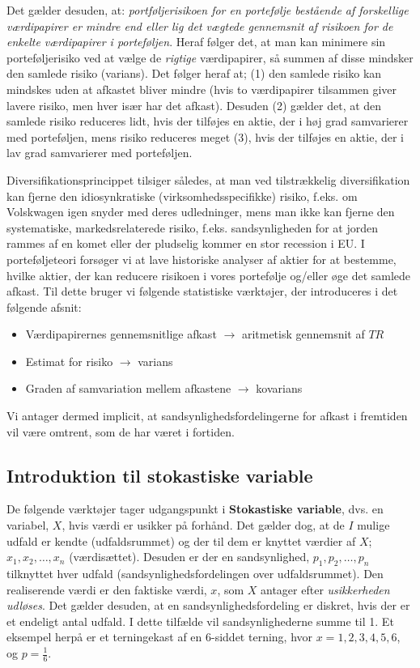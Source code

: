 \documentclass[10pt,reqno, usenames]{article}
\begin{document}
Det gælder desuden, at: \textit{portføljerisikoen for en portefølje bestående af forskellige værdipapirer er mindre end eller lig det
vægtede gennemsnit af risikoen for de enkelte værdipapirer i porteføljen}. Heraf følger det, at man kan minimere sin porteføljerisiko ved at vælge de \textit{rigtige} værdipapirer, så summen af disse mindsker den samlede risiko (varians). Det følger heraf at; (1) den samlede risiko kan mindskes uden at afkastet bliver mindre (hvis to værdipapirer tilsammen giver lavere risiko, men hver især har det afkast). Desuden (2) gælder det, at den samlede risiko reduceres lidt, hvis der tilføjes en aktie, der i høj grad samvarierer med porteføljen, mens risiko reduceres meget (3), hvis der tilføjes en aktie, der i lav grad samvarierer med porteføljen. 

\vspace{10 pt}

Diversifikationsprincippet tilsiger således, at man ved tilstrækkelig diversifikation kan fjerne den idiosynkratiske (virksomhedsspecifikke) risiko, f.eks. om Volskwagen igen snyder med deres udledninger, mens man ikke kan fjerne den systematiske, markedsrelaterede risiko, f.eks. sandsynligheden for at jorden rammes af en komet eller der pludselig kommer en stor recession i EU. I porteføljeteori forsøger vi at lave historiske analyser af aktier for at bestemme, hvilke aktier, der kan reducere risikoen i vores portefølje og/eller øge det samlede afkast. Til dette bruger vi følgende statistiske værktøjer, der introduceres i det følgende afsnit: 

\begin{itemize}
    \item Værdipapirernes gennemsnitlige afkast $\rightarrow$ aritmetisk gennemsnit af $TR$
    \item Estimat for risiko $\rightarrow$ varians
    \item Graden af samvariation mellem afkastene $\rightarrow$ kovarians
\end{itemize}

Vi antager dermed implicit, at sandsynlighedsfordelingerne for afkast i
fremtiden vil være omtrent, som de har været i fortiden. 

\subsection{Introduktion til stokastiske variable}
De følgende værktøjer tager udgangspunkt i \textbf{Stokastiske variable}, dvs. en variabel, $X$, hvis værdi er usikker på forhånd. Det gælder dog, at de $I$ mulige udfald er kendte (udfaldsrummet) og der til dem er knyttet værdier af $X$; $x_1, x_2, \ldots, x_n$ (værdisættet). Desuden er der en sandsynlighed, $p_1, p_2, \ldots, p_n$ tilknyttet hver udfald (sandsynlighedsfordelingen over udfaldsrummet). Den realiserende værdi er den faktiske værdi, $x$, som $X$ antager efter \textit{usikkerheden udløses}. Det gælder desuden, at en sandsynlighedsfordeling er diskret, hvis der er et endeligt antal udfald. I dette tilfælde vil sandsynlighederne summe til 1. Et eksempel herpå er et terningekast af en 6-siddet terning, hvor $x=1,2,3,4,5,6$, og $p=\frac{1}{6}$. 
\end{document}
